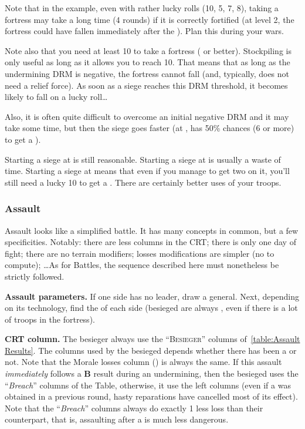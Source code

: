 \begin{playtip}
  Note that in the example, even with rather lucky rolls (10, 5, 7, 8), taking
  a fortress may take a long time (4 rounds) if it is correctly fortified (at
  level 2, the fortress could have fallen immediately after the
  ). Plan this during your wars.

  Note also that you need at least 10 to take a fortress ( or
  better). Stockpiling \USURE is only useful as long as it allows you to reach
  10. That means that as long as the undermining DRM is negative, the fortress
  cannot fall (and, typically, does not need a relief force). As soon as a
  siege reaches this  DRM threshold, it becomes likely to fall on a
  lucky roll\ldots

  Also, it is often quite difficult to overcome an initial negative DRM and it
  may take some time, but then the siege goes faster (at , \FRA has
  50\% chances (6 or more) to get a ).

  Starting a siege at  is still reasonable. Starting a siege at
   is usually a waste of time. Starting a siege at  means
  that even if you manage to get two \USURE\faceplus on it, you'll still need
  a lucky 10 to get a . There are certainly better uses of your
  troops.
\end{playtip}

\subsubsection{Assault}
Assault looks like a simplified battle. It has many concepts in common, but a
few specificities. Notably: there are less columns in the CRT; there is only
one day of fight; there are no terrain modifiers; losses modifications are
simpler (no  to compute); \ldots As for Battles, the
sequence described here must nonetheless be strictly followed.


\textbf{Assault parameters.} If one side has no leader, draw a
 general. Next, depending on its technology, find the
 of each side (besieged are always , even if
there is a lot of  troops in the fortress).

\textbf{CRT column.} The besieger always use the ``\textsc{Besieger}'' columns
of~\ref{table:Assault Results}. The columns used by the besieged depends
whether there has been a  or not. Note that the Morale losses
column (\textetoile) is always the same. If this assault \emph{immediately}
follows a \textbf{B} result during an undermining, then the besieged uses the
``\emph{Breach}'' columns of the Table, otherwise, it use the left columns
(even if a  was obtained in a previous round, hasty reparations
have cancelled most of its effect). Note that the ``\emph{Breach}'' columns
always do exactly 1 less loss than their counterpart, that is, assaulting
after a  is much less dangerous.

